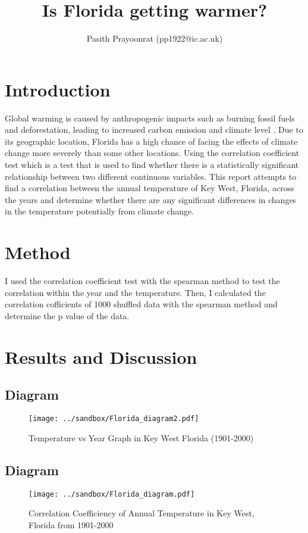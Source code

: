 \documentclass[12pt]{article}
\title{Is Florida getting warmer?}
\author{Pasith Prayoonrat (pp1922@ic.ac.uk)}
\begin{document}
  \maketitle

\section{Introduction}
Global warming is caused by anthropogenic impacts such as burning fossil fuels and deforestation, leading to increased carbon emission and climate level \cite{houghton2005global}.
Due to its geographic location, Florida has a high chance of facing the effects of climate change more severely than some other locations.
Using the correlation coefficient test which is a test that is used to find whether there is a statistically significant relationship between two different continuous variables.
This report attempts to find a correlation between the annual temperature of Key West, Florida, across the years and determine whether there are any significant differences in changes in the temperature potentially from climate change.

\section{Method}
  I used the correlation coefficient test with the spearman method to test the correlation within the year and the temperature.
  Then, I calculated the correlation cofficients of 1000 shuffled data with the spearman method and determine the p value of the data.

\section{Results and Discussion}
\subsection*{Diagram}
\begin{figure}[H]
\centering
\texttt{[image: ../sandbox/Florida\_diagram2.pdf]}
\caption{\label{fig:Florida_graph2} Temperature vs Year Graph in Key West Florida (1901-2000)}
\end{figure}
\subsection*{Diagram}
\begin{figure}[H]
\centering
\texttt{[image: ../sandbox/Florida\_diagram.pdf]}
\caption{\label{fig:Florida_graph} Correlation Coefficiency of Annual Temperature in Key West, Florida from 1901-2000}
\end{figure}
\end{document}
